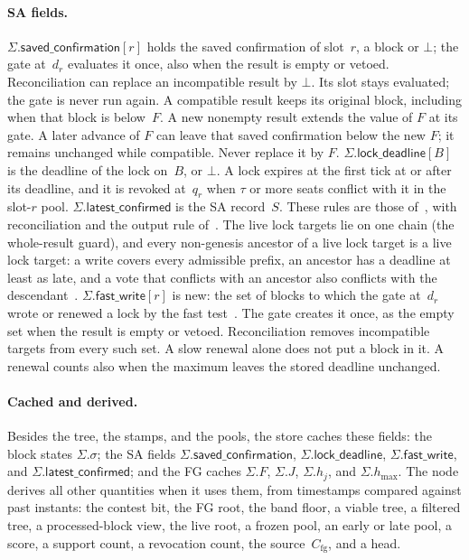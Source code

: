 \documentclass{article}
\theoremstyle{plain}
\theoremstyle{definition}
\theoremstyle{remark}
\newcommand{\hmax}{h_{\max}}
\newcommand{\latestConfirmed}{\mathsf{latest\_confirmed}}
\newcommand{\Cfg}{C_{\mathrm{fg}}}
\newcommand{\savedConfirmation}{\mathsf{saved\_confirmation}}
\newcommand{\lockDeadline}{\mathsf{lock\_deadline}}
\newcommand{\fastWrite}{\mathsf{fast\_write}}
\newcommand{\SAS}{\cite{SAS}}
\newcommand{\FAST}[1]{\cite[\S#1]{FAST}}
\newcommand{\LDP}[1]{\cite[\S#1]{LDP}}
\begin{document}
\paragraph{SA fields.}  $\Sigma.\savedConfirmation[r]$ holds the saved
confirmation of slot~$r$, a block or $\bot$; the gate at~$d_r$ evaluates it
once, also when the result is empty or vetoed.  Reconciliation can
replace an incompatible result by $\bot$.  Its slot stays evaluated;
the gate is never run again.  A compatible result keeps its original
block, including when that block is below~$F$.
A new nonempty result extends the value of $F$ at its gate.
A later advance of $F$ can leave that saved confirmation below the new $F$;
it remains unchanged while compatible.  Never replace it by $F$.
$\Sigma.\lockDeadline[B]$ is
the deadline of the lock on~$B$, or $\bot$.  A lock expires at the
first tick at or after its deadline, and it is revoked at~$q_r$ when
$\tau$ or more seats conflict with it in the slot-$r$ pool.
$\Sigma.\latestConfirmed$ is the SA record~$S$.  These rules are those
of~\SAS, with reconciliation and the output rule of~\cite[\S2]{FB}.
The live lock targets lie on one chain (the
whole-result guard), and every non-genesis ancestor of a live lock
target is a live lock target: a write covers every admissible prefix,
an ancestor has a deadline at least as late, and a vote that conflicts
with an ancestor also conflicts with the descendant~\LDP{1}.
$\Sigma.\fastWrite[r]$ is new: the set of blocks to which the gate
at~$d_r$ wrote or renewed a lock by the fast test~\FAST{3.1}.  The
gate creates it once, as the empty set when the result is empty or
vetoed.  Reconciliation removes incompatible targets from every such set.  A slow renewal alone does not put a block in it.  A renewal
counts also when the maximum leaves the stored deadline unchanged.

\paragraph{Cached and derived.}  Besides the tree, the stamps, and
the pools, the store caches these fields: the block states
$\Sigma.\sigma$; the SA fields $\Sigma.\savedConfirmation$, $\Sigma.\lockDeadline$,
$\Sigma.\fastWrite$, and $\Sigma.\latestConfirmed$; and the FG caches
$\Sigma.F$, $\Sigma.J$, $\Sigma.h_j$, and $\Sigma.\hmax$.  The node
derives all other quantities when it uses them, from timestamps
compared against past instants: the contest bit, the FG root, the band
floor, a viable tree, a filtered tree, a processed-block view, the live
root, a frozen pool, an early or late pool, a score, a support count, a
revocation count, the source~$\Cfg$, and a head.
\end{document}
